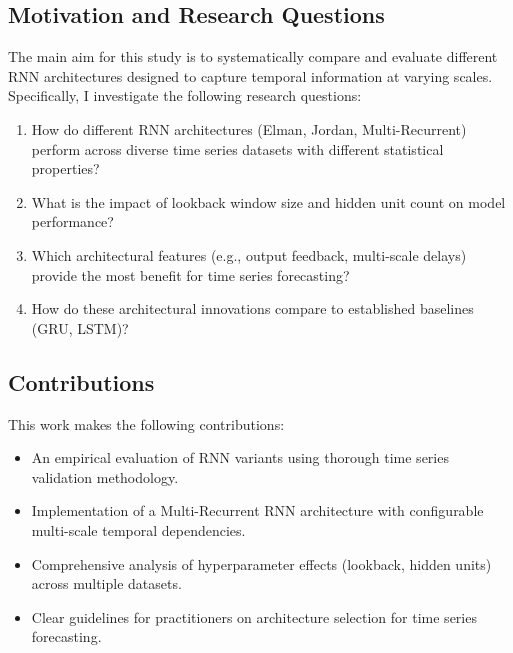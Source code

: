\documentclass[conference]{IEEEtran}
\begin{document}
\subsection{Motivation and Research Questions}

The main aim for this study is to systematically compare
and evaluate different RNN architectures designed to capture temporal
information at varying scales. Specifically, I investigate the following
research questions:

\begin{enumerate}
    \item How do different RNN architectures (Elman, Jordan,
    Multi-Recurrent) perform across diverse time series datasets with
    different statistical properties?
    
    \item What is the impact of lookback window size and hidden unit count
    on model performance?
    
    \item Which architectural features (e.g., output feedback, multi-scale
    delays) provide the most benefit for time series forecasting?
    
    \item How do these architectural innovations compare to established
    baselines (GRU, LSTM)?
\end{enumerate}

\subsection{Contributions}

This work makes the following contributions:

\begin{itemize}
    \item An empirical evaluation of RNN variants using
    thorough time series validation methodology.
    
    \item Implementation of a Multi-Recurrent RNN architecture
    with configurable multi-scale temporal dependencies.
    
    \item Comprehensive analysis of hyperparameter effects (lookback,
    hidden units) across multiple datasets.
    
    \item Clear guidelines for practitioners on architecture selection
    for time series forecasting.
\end{itemize}
\end{document}
